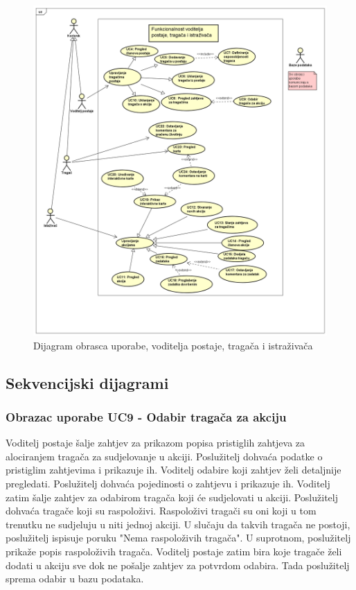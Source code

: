 \begin{packed_item}
\begin{packed_item}
					\begin{figure}[H]
						\includegraphics[scale=0.4]{dijagrami/voditelj-tragac-istrazivac-dijagram.PNG} 
						\centering
						\caption{Dijagram obrasca uporabe, voditelja postaje, tragača i istraživača}
						\label{fig:promjene}
					\end{figure}
					
			\eject				
				
			\subsection{Sekvencijski dijagrami}
			
				\subsubsection{Obrazac uporabe UC9 - Odabir tragača za akciju}
				Voditelj postaje šalje zahtjev za prikazom popisa pristiglih zahtjeva za alociranjem tragača za sudjelovanje u akciji. Poslužitelj dohvaća podatke o pristiglim zahtjevima i prikazuje ih. Voditelj odabire koji zahtjev želi detaljnije pregledati. Poslužitelj dohvaća pojedinosti o zahtjevu i prikazuje ih. Voditelj zatim šalje zahtjev za odabirom tragača koji će sudjelovati u akciji. Poslužitelj dohvaća tragače koji su raspoloživi. Raspoloživi tragači su oni koji u tom trenutku ne sudjeluju u niti jednoj akciji. U slučaju da takvih tragača ne postoji, poslužitelj ispisuje poruku "Nema raspoloživih tragača". U suprotnom, poslužitelj prikaže popis raspoloživih tragača.  Voditelj postaje zatim bira koje tragače želi dodati u akciju sve dok ne pošalje zahtjev za potvrdom odabira. Tada poslužitelj sprema odabir u bazu podataka.
				

\end{packed_item}
\end{packed_item}
